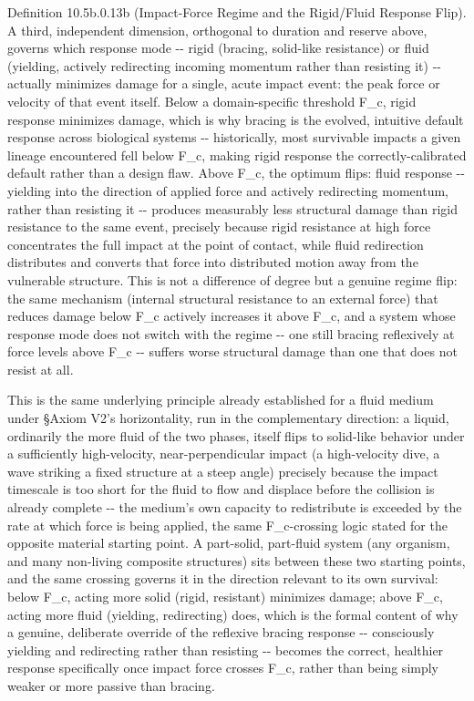 \documentclass[
]{article}
\begin{document}
Definition 10.5b.0.13b (Impact-Force Regime and the Rigid/Fluid Response
Flip). A third, independent dimension, orthogonal to duration and
reserve above, governs which response mode -\/- rigid (bracing,
solid-like resistance) or fluid (yielding, actively redirecting incoming
momentum rather than resisting it) -\/- actually minimizes damage for a
single, acute impact event: the peak force or velocity of that event
itself. Below a domain-specific threshold F\_c, rigid response minimizes
damage, which is why bracing is the evolved, intuitive default response
across biological systems -\/- historically, most survivable impacts a
given lineage encountered fell below F\_c, making rigid response the
correctly-calibrated default rather than a design flaw. Above F\_c, the
optimum flips: fluid response -\/- yielding into the direction of
applied force and actively redirecting momentum, rather than resisting
it -\/- produces measurably less structural damage than rigid resistance
to the same event, precisely because rigid resistance at high force
concentrates the full impact at the point of contact, while fluid
redirection distributes and converts that force into distributed motion
away from the vulnerable structure. This is not a difference of degree
but a genuine regime flip: the same mechanism (internal structural
resistance to an external force) that reduces damage below F\_c actively
increases it above F\_c, and a system whose response mode does not
switch with the regime -\/- one still bracing reflexively at force
levels above F\_c -\/- suffers worse structural damage than one that
does not resist at all.

This is the same underlying principle already established for a fluid
medium under §Axiom V2's horizontality, run in the complementary
direction: a liquid, ordinarily the more fluid of the two phases, itself
flips to solid-like behavior under a sufficiently high-velocity,
near-perpendicular impact (a high-velocity dive, a wave striking a fixed
structure at a steep angle) precisely because the impact timescale is
too short for the fluid to flow and displace before the collision is
already complete -\/- the medium's own capacity to redistribute is
exceeded by the rate at which force is being applied, the same
F\_c-crossing logic stated for the opposite material starting point. A
part-solid, part-fluid system (any organism, and many non-living
composite structures) sits between these two starting points, and the
same crossing governs it in the direction relevant to its own survival:
below F\_c, acting more solid (rigid, resistant) minimizes damage; above
F\_c, acting more fluid (yielding, redirecting) does, which is the
formal content of why a genuine, deliberate override of the reflexive
bracing response -\/- consciously yielding and redirecting rather than
resisting -\/- becomes the correct, healthier response specifically once
impact force crosses F\_c, rather than being simply weaker or more
passive than bracing.
\end{document}
